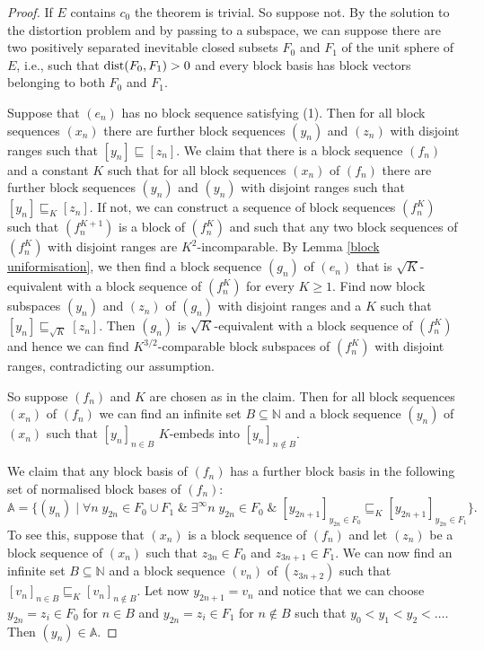 \documentclass[10pt]{amsart}
\numberwithin{equation}{section}
\begin{document}
\begin{proof}
If $E$ contains $c_0$ the theorem is trivial. So suppose not. By the solution
to the distortion problem  and by passing to a subspace, we can suppose there
are two positively separated inevitable closed subsets $F_0$ and $F_1$ of the
unit sphere of $E$, i.e., such that ${\rm dist}(F_0,F_1)>0$ and every block
basis has block vectors belonging to both $F_0$ and $F_1$.

Suppose that $(e_n)$ has no block sequence satisfying (1). Then for all block
sequences $(x_n)$ there are further block sequences $(y_n)$ and $(z_n)$ with
disjoint ranges such that $[y_n]\sqsubseteq [z_n]$. We claim that there is a
block sequence $(f_n)$ and a constant $K$ such that for all block sequences
$(x_n)$ of $(f_n)$ there are further block sequences $(y_n)$ and $(y_n)$ with
disjoint ranges such that $[y_n]\sqsubseteq_K [z_n]$. If not, we can construct
a sequence of block sequences $(f_n^K)$ such that $(f_n^{K+1})$ is a block of
$(f_n^K)$ and such that any two block sequences of $(f_n^K)$ with disjoint
ranges are $K^2$-incomparable. By Lemma \ref{block uniformisation}, we then
find a block sequence $(g_n)$ of $(e_n)$ that is $\sqrt K$-equivalent with a
block sequence of $(f_n^K)$ for every $K{\ensuremath{\geqslant}} 1$. Find now block subspaces
$(y_n)$ and $(z_n)$ of $(g_n)$ with disjoint ranges and a $K$ such that
$[y_n]\sqsubseteq_{\sqrt K} [z_n]$. Then $(g_n)$ is $\sqrt K$-equivalent with a
block sequence of $(f_n^K)$ and hence we can find $K^{3/2}$-comparable block
subspaces of $(f_n^K)$ with disjoint ranges, contradicting our assumption.

So suppose $(f_n)$ and $K$ are chosen as in the claim. Then for all block
sequences $(x_n)$ of $(f_n)$ we can find an infinite set $B\subseteq {\mathbb N}$ and a
block sequence $(y_n)$ of $(x_n)$ such that $[y_n]_{n \in B}$ $K$-embeds into
$[y_n]_{n\notin B}$.

We claim that any block basis of $(f_n)$ has a further block basis in the
following set of normalised block bases of $(f_n)$:
$$
{\mathbb A}=\{(y_n){ \; \big| \;} {\forall} n\; y_{2n}\in F_0\cup F_1\;\&\; {\exists}^\infty n\; y_{2n}\in
F_0\;\&\;[y_{2n+1}]_{y_{2n}\in F_0}\sqsubseteq_{K} [y_{2n+1}]_{y_{2n}\in
F_1}\}.
$$
To see this, suppose that $(x_n)$ is a block sequence of $(f_n)$ and let
$(z_n)$ be a block sequence of $(x_n)$ such that $z_{3n}\in F_0$ and
$z_{3n+1}\in F_1$. We can now find an infinite set $B\subseteq {\mathbb N}$ and a block
sequence $(v_n)$ of $(z_{3n+2})$ such that $[v_n]_{n \in B}\sqsubseteq_K
[v_n]_{n\notin B}$. Let now $y_{2n+1}=v_n$ and notice that we can choose
$y_{2n}=z_i\in F_0$ for $n\in B$ and $y_{2n}=z_i\in F_1$ for $n\notin B$ such
that $y_0<y_1<y_2<\ldots$. Then $(y_n)\in {\mathbb A}$.


\end{proof}
\end{document}
